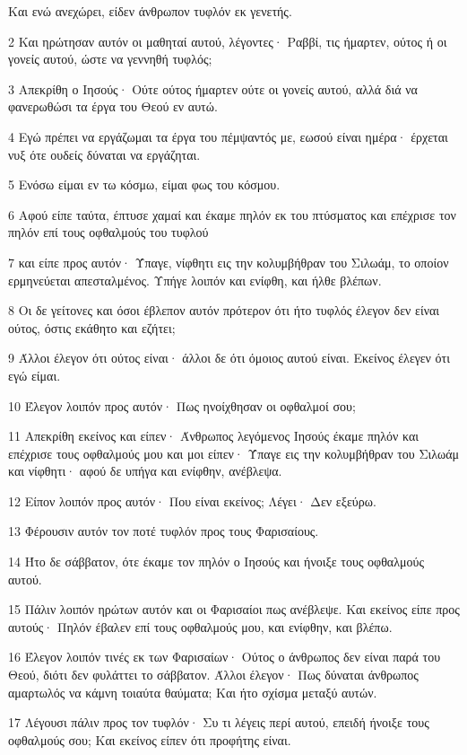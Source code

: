 \par Και ενώ ανεχώρει, είδεν άνθρωπον τυφλόν εκ γενετής.
\par 2 Και ηρώτησαν αυτόν οι μαθηταί αυτού, λέγοντες· Ραββί, τις ήμαρτεν, ούτος ή οι γονείς αυτού, ώστε να γεννηθή τυφλός;
\par 3 Απεκρίθη ο Ιησούς· Ούτε ούτος ήμαρτεν ούτε οι γονείς αυτού, αλλά διά να φανερωθώσι τα έργα του Θεού εν αυτώ.
\par 4 Εγώ πρέπει να εργάζωμαι τα έργα του πέμψαντός με, εωσού είναι ημέρα· έρχεται νυξ ότε ουδείς δύναται να εργάζηται.
\par 5 Ενόσω είμαι εν τω κόσμω, είμαι φως του κόσμου.
\par 6 Αφού είπε ταύτα, έπτυσε χαμαί και έκαμε πηλόν εκ του πτύσματος και επέχρισε τον πηλόν επί τους οφθαλμούς του τυφλού
\par 7 και είπε προς αυτόν· Ύπαγε, νίφθητι εις την κολυμβήθραν του Σιλωάμ, το οποίον ερμηνεύεται απεσταλμένος. Υπήγε λοιπόν και ενίφθη, και ήλθε βλέπων.
\par 8 Οι δε γείτονες και όσοι έβλεπον αυτόν πρότερον ότι ήτο τυφλός έλεγον δεν είναι ούτος, όστις εκάθητο και εζήτει;
\par 9 Άλλοι έλεγον ότι ούτος είναι· άλλοι δε ότι όμοιος αυτού είναι. Εκείνος έλεγεν ότι εγώ είμαι.
\par 10 Έλεγον λοιπόν προς αυτόν· Πως ηνοίχθησαν οι οφθαλμοί σου;
\par 11 Απεκρίθη εκείνος και είπεν· Άνθρωπος λεγόμενος Ιησούς έκαμε πηλόν και επέχρισε τους οφθαλμούς μου και μοι είπεν· Ύπαγε εις την κολυμβήθραν του Σιλωάμ και νίφθητι· αφού δε υπήγα και ενίφθην, ανέβλεψα.
\par 12 Είπον λοιπόν προς αυτόν· Που είναι εκείνος; Λέγει· Δεν εξεύρω.
\par 13 Φέρουσιν αυτόν τον ποτέ τυφλόν προς τους Φαρισαίους.
\par 14 Ήτο δε σάββατον, ότε έκαμε τον πηλόν ο Ιησούς και ήνοιξε τους οφθαλμούς αυτού.
\par 15 Πάλιν λοιπόν ηρώτων αυτόν και οι Φαρισαίοι πως ανέβλεψε. Και εκείνος είπε προς αυτούς· Πηλόν έβαλεν επί τους οφθαλμούς μου, και ενίφθην, και βλέπω.
\par 16 Έλεγον λοιπόν τινές εκ των Φαρισαίων· Ούτος ο άνθρωπος δεν είναι παρά του Θεού, διότι δεν φυλάττει το σάββατον. Άλλοι έλεγον· Πως δύναται άνθρωπος αμαρτωλός να κάμνη τοιαύτα θαύματα; Και ήτο σχίσμα μεταξύ αυτών.
\par 17 Λέγουσι πάλιν προς τον τυφλόν· Συ τι λέγεις περί αυτού, επειδή ήνοιξε τους οφθαλμούς σου; Και εκείνος είπεν ότι προφήτης είναι.
